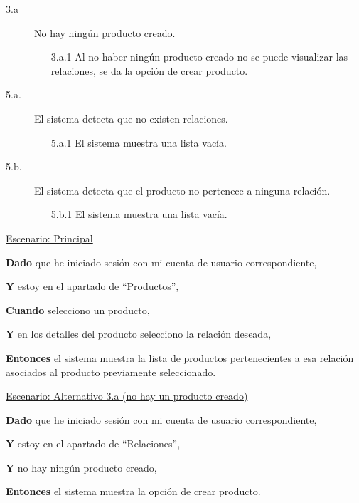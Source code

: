 \begin{description}

    \item[3.a] No hay ningún producto creado.
    \begin{enumerate}
        \item[3.a.1] Al no haber ningún producto creado no se puede visualizar las relaciones, se da la opción de crear producto.
    \end{enumerate}

    \item[5.a.] El sistema detecta que no existen relaciones.
    \begin{enumerate}
        \item[5.a.1] El sistema muestra una lista vacía.
    \end{enumerate}

    \item[5.b.] El sistema detecta que el producto no pertenece a ninguna relación.
    \begin{enumerate}
        \item[5.b.1] El sistema muestra una lista vacía.
    \end{enumerate}

\end{description}

\underline{Escenario: Principal}\par
\vspace{0.15cm}
\textbf{Dado} que he iniciado sesión con mi cuenta de usuario correspondiente,\par
\textbf{Y} estoy en el apartado de \enquote{Productos},\par
\textbf{Cuando} selecciono un producto,\par
\textbf{Y} en los detalles del producto selecciono la relación deseada,\par
\textbf{Entonces} el sistema muestra la lista de productos pertenecientes a esa relación asociados al producto previamente seleccionado.\par

\vspace{0.20cm}

\underline{Escenario: Alternativo 3.a (no hay un producto creado)}\par
\vspace{0.15cm}
\textbf{Dado} que he iniciado sesión con mi cuenta de usuario correspondiente,\par
\textbf{Y} estoy en el apartado de \enquote{Relaciones},\par
\textbf{Y} no hay ningún producto creado,\par
\textbf{Entonces} el sistema muestra la opción de crear producto.\par

